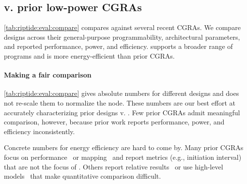 \subsection{\riptide v. prior low-power CGRAs}
\label{riptide:eval:compare}
\autoref{tab:riptide:eval:compare} compares \riptide against several recent CGRAs.
% 
We compare designs across their general-purpose programmability, architectural parameters, and reported performance, power, and efficiency.
% 
\riptide supports a broader range of programs and is more energy-efficient than prior CGRAs.
%

\paragraph{Making a fair comparison}
\autoref{tab:riptide:eval:compare} gives absolute numbers for different designs and does not re-scale them to normalize the node.
% 
These numbers are our best effort at accurately characterizing prior designs v. \riptide.
%
Few prior CGRAs admit meaningful comparison, however, because prior work reports performance, power, and efficiency inconsistently.

Concrete numbers for energy efficiency are hard to come by.
%
Many prior CGRAs focus on performance~\cite{plasticine,voitsechov2014single} or mapping~\cite{4dcgra,lee2021ultra,himap} and report metrics (e.g., initiation interval) that are not the focus of \riptide.
% 
Others report relative results~\cite{torng2021ultra,nguyen2021fifer} or use high-level models~\cite{weng2020hybrid,nguyen2021fifer} that make quantitative comparison difficult.
%

